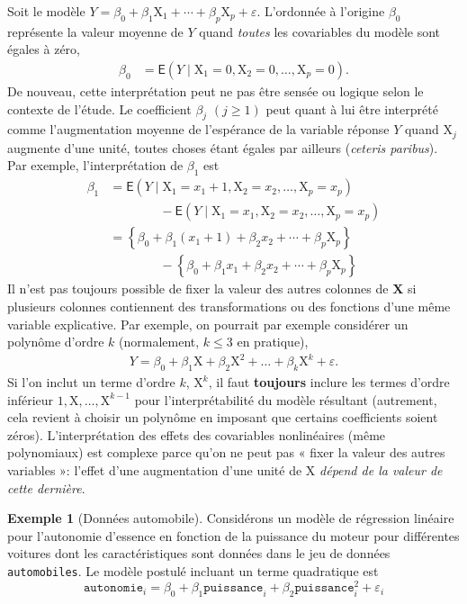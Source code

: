\documentclass[
  11pt,
  letterpaper,
]{article}
\theoremstyle{definition}
\theoremstyle{definition}
\newtheorem{example}{Exemple}[section]
\theoremstyle{definition}
\theoremstyle{definition}
\theoremstyle{remark}
\begin{document}
Soit le modèle \(Y= \beta_0 + \beta_1 \mathrm{X}_1 + \cdots + \beta_p\mathrm{X}_p + \varepsilon\). L'ordonnée à l'origine \(\beta_0\) représente la valeur moyenne de \(Y\) quand \emph{toutes} les covariables du modèle sont égales à zéro,
\begin{align*}
\beta_0 &= \mathsf{E}(Y \mid \mathrm{X}_1=0,\mathrm{X}_2=0,\ldots,\mathrm{X}_p=0).
\end{align*}
De nouveau, cette interprétation peut ne pas être sensée ou logique selon le contexte de l'étude. Le coefficient \(\beta_j\) \((j \geq 1)\) peut quant à lui être interprété comme l'augmentation moyenne de l'espérance de la variable réponse \(Y\) quand \(\mathrm{X}_j\) augmente d'une unité, toutes choses étant égales par ailleurs (\emph{ceteris paribus}). Par exemple, l'interprétation de \(\beta_1\) est
\begin{align*}
\beta_1 &= \mathsf{E}(Y \mid \mathrm{X}_1=x_1+1,\mathrm{X}_2=x_2,\ldots,\mathrm{X}_p=x_p) \\
& \qquad \qquad - \mathsf{E}(Y \mid \mathrm{X}_1=x_1,\mathrm{X}_2=x_2,\ldots,\mathrm{X}_p=x_p) \\
&= \left\{\beta_0 + \beta_1 (x_1+1) + \beta_2 x_2 + \cdots +\beta_p \mathrm{X}_p \right\} \\
& \qquad \qquad -\left\{\beta_0 + \beta_1 x_1 + \beta_2 x_2 + \cdots +\beta_p \mathrm{X}_p \right\}
\end{align*}
Il n'est pas toujours possible de fixer la valeur des autres colonnes de \(\mathbf{X}\) si plusieurs colonnes contiennent des transformations ou des fonctions d'une même variable explicative. Par exemple, on pourrait par exemple considérer un polynôme d'ordre \(k\) (normalement, \(k\leq 3\) en pratique),
\begin{align*}
Y=\beta_0+ \beta_1 \mathrm{X}+ \beta_2 \mathrm{X}^2 + \ldots +\beta_k \mathrm{X}^k + \varepsilon.
\end{align*}
Si l'on inclut un terme d'ordre \(k\), \(\mathrm{X}^k\), il faut \textbf{toujours} inclure les termes d'ordre inférieur \(1, \mathrm{X}, \ldots, \mathrm{X}^{k-1}\) pour l'interprétabilité du modèle résultant (autrement, cela revient à choisir un polynôme en imposant que certains coefficients soient zéros). L'interprétation des effets des covariables nonlinéaires (même polynomiaux) est complexe parce qu'on ne peut pas « fixer la valeur des autres variables »: l'effet d'une augmentation d'une unité de \(\mathrm{X}\) \emph{dépend de la valeur de cette dernière}.

\begin{example}[Données automobile]
\protect\hypertarget{exm:automobile}{}\label{exm:automobile}Considérons un modèle de régression linéaire pour l'autonomie d'essence en fonction de la puissance du moteur pour différentes voitures dont les caractéristiques sont données dans le jeu de données \texttt{automobiles}. Le modèle postulé incluant un terme quadratique est
\[
\texttt{autonomie}_i = \beta_0 + \beta_1 \texttt{puissance}_i + \beta_2 \texttt{puissance}_i^2 + \varepsilon_i
\]
\end{example}
\end{document}
